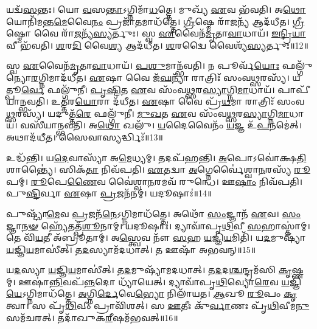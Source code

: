 𑌯𑌦𑍍𑌵᳴\-\ul{𑌸}\-𑌨𑍍𑌤𑌃।
𑌯𑍋 \ul{𑌵}\-𑌸\-\ul{𑌨𑍍𑌤𑌾}\-\-𑌽𑌗𑍍𑌨𑌿𑌮𑌾᳴\-\ul{𑌧}\-𑌤𑍍𑌤𑍇।
𑌮𑍁𑌖𑍍𑌯᳴ \ul{𑌏}\-𑌵 𑌭᳴𑌵𑌤𑌿।
𑌅\-\ul{𑌥𑍋} 𑌯𑍋𑌨𑌿᳴𑌮𑌨𑍍𑌤\-\ul{𑌮𑍇}\-𑌵𑍈\-\ul{𑌨𑌂} 𑌪𑍍𑌰𑌜𑌾᳴\-\ul{𑌤}\-𑌮𑌾𑌧᳴𑌤𑍍𑌤𑍇।
\-\ul{𑌗𑍍𑌰𑍀}\-𑌷𑍍𑌮𑍇 𑌰𑌾᳴\-\ul{𑌜}\-𑌨𑍍𑌯᳴ 𑌆𑌦᳴𑌧𑍀𑌤।
\-\ul{𑌗𑍍𑌰𑍀}\-𑌷𑍍𑌮𑍋 𑌵𑍈 𑌰𑌾᳴\-\ul{𑌜}\-𑌨𑍍𑌯᳴\-\ul{𑌸𑍍𑌯}\-𑌰𑍍𑌤𑍁𑌃।
𑌸𑍍𑌵 \ul{𑌏}\-𑌵𑍈𑌨᳴\-\ul{𑌮𑍃}\-𑌤𑌾\-\ul{𑌵𑌾}\-𑌧𑌾𑌯᳴।
\-\ul{𑌇}\-\-\ul{𑌨𑍍𑌦𑍍𑌰𑌿}\-\-\ul{𑌯𑌾}\-𑌵𑍀 𑌭᳴𑌵𑌤𑌿।
\-\ul{𑌶}\-𑌰\-\ul{𑌦𑌿} 𑌵𑍈\-\ul{𑌶𑍍𑌯} 𑌆𑌦᳴𑌧𑍀𑌤।
\-\ul{𑌶}\-𑌰𑌦𑍍𑌵𑍈 𑌵𑍈𑌶𑍍𑌯᳴\-\ul{𑌸𑍍𑌯}\-𑌰𑍍𑌤𑍁𑌃॥12॥

𑌸𑍍𑌵 \ul{𑌏}\-𑌵𑍈𑌨᳴\-\ul{𑌮𑍃}\-𑌤𑌾\-\ul{𑌵𑌾}\-𑌧𑌾𑌯᳴।
\-\ul{𑌪}\-\-\ul{𑌶𑍁}\-𑌮𑌾𑌨𑍍𑌭᳴𑌵𑌤𑌿।
𑌨 𑌪𑍂𑌰𑍍𑌵᳴\-\ul{𑌯𑍋𑌃} 𑌫𑌲𑍍𑌗𑍁᳴𑌨𑍍𑌯𑍋\-\ul{𑌰}\-𑌗𑍍𑌨𑌿𑌮𑌾𑌦᳴𑌧𑍀𑌤।
\-\ul{𑌏}\-𑌷𑌾 𑌵𑍈 𑌜᳴\-\ul{𑌘}\-𑌨𑍍𑌯𑌾᳴ 𑌰𑌾𑌤𑍍𑌰𑌿𑌃᳴ 𑌸𑌂𑌵\-\ul{𑌥𑍍𑌸}\-𑌰𑌸𑍍𑌯᳴।
𑌯𑌤𑍍𑌪𑍂\-\ul{𑌰𑍍𑌵𑍇} 𑌫𑌲𑍍𑌗𑍁᳴𑌨𑍀।
\-\ul{𑌪𑍃}\-\-\ul{𑌷𑍍𑌟𑌿}\-𑌤 \ul{𑌏}\-𑌵 𑌸𑌂᳴𑌵\-\ul{𑌥𑍍𑌸}\-𑌰\-\ul{𑌸𑍍𑌯𑌾}\-𑌗𑍍𑌨𑌿\-\ul{𑌮𑌾}\-𑌧𑌾𑌯᳴।
𑌪𑌾𑌪𑍀᳴𑌯𑌾𑌨𑍍𑌭𑌵𑌤𑌿।
𑌉𑌤𑍍𑌤᳴𑌰\-\ul{𑌯𑍋}\-𑌰𑌾 𑌦᳴𑌧𑍀𑌤।
\-\ul{𑌏}\-𑌷𑌾 𑌵𑍈 𑌪𑍍𑌰᳴\-\ul{𑌥}\-𑌮𑌾 𑌰𑌾𑌤𑍍𑌰𑌿𑌃᳴ 𑌸𑌂𑌵\-\ul{𑌥𑍍𑌸}\-𑌰𑌸𑍍𑌯᳴।
𑌯𑌦𑍁𑌤𑍍𑌤᳴\-\ul{𑌰𑍇} 𑌫𑌲𑍍𑌗𑍁᳴𑌨𑍀।
\-\ul{𑌮𑍁}\-\-\ul{𑌖}\-𑌤 \ul{𑌏}\-𑌵 𑌸𑌂᳴𑌵\-\ul{𑌥𑍍𑌸}\-𑌰\-\ul{𑌸𑍍𑌯𑌾}\-𑌗𑍍𑌨𑌿\-\ul{𑌮𑌾}\-𑌧𑌾𑌯᳴।
𑌵𑌸𑍀᳴𑌯𑌾𑌨𑍍𑌭𑌵𑌤𑌿।
𑌅\-\ul{𑌥𑍋} 𑌖𑌲𑍁᳴।
\-\ul{𑌯}\-𑌦𑍈𑌵𑍈𑌨𑌂᳴ \ul{𑌯}\-𑌜𑍍𑌞 𑌉᳴\-\ul{𑌪}\-𑌨𑌮𑍇॑𑌤𑍍।
𑌅𑌥𑌾𑌦᳴𑌧𑍀𑌤।
𑌸𑍈𑌵𑌾𑌸𑍍𑌯𑌰𑍍𑌦𑍍𑌧𑌿𑌃᳴॥13॥\anuvakamend[𑌖𑌲𑍍𑌵𑌾᳴𑌧𑌿𑌥𑍍𑌸\-\ul{𑌨𑍍𑌤} 𑌫𑌲𑍍𑌗𑍁᳴𑌨𑍍𑌯𑍋\-\ul{𑌰}\-𑌗𑍍𑌨𑌿𑌮𑌾𑌦᳴𑌧𑍀𑌤𑌾𑌸𑌨𑍍𑌨𑌪𑌤𑌤𑌾𑌮𑍃\-\ul{𑌤𑍂}\-𑌨𑌾𑌂 𑌵𑍈𑌶𑍍𑌯᳴\-\ul{𑌸𑍍𑌯}\-𑌰𑍍𑌤𑍁𑌰𑍁𑌤𑍍𑌤᳴\-\ul{𑌰𑍇} 𑌫𑌲𑍍𑌗𑍁᳴\-\ul{𑌨𑍀} 𑌷𑌟𑍍𑌚᳴]

𑌉𑌦𑍍𑌧᳴𑌨𑍍𑌤𑌿।
𑌯\-\ul{𑌦𑍇}\-𑌵𑌾𑌸𑍍𑌯𑌾᳴ 𑌅\-\ul{𑌮𑍇}\-𑌧𑍍𑌯𑌮𑍍।
𑌤𑌦𑌪᳴𑌹𑌨𑍍𑌤𑌿।
\-\ul{𑌅}\-𑌪𑍋𑌽𑌵𑍋॑𑌕𑍍𑌷\-\ul{𑌤𑌿} 𑌶𑌾𑌨𑍍𑌤𑍍𑌯𑍈॑।
𑌸𑌿𑌕᳴\-\ul{𑌤𑌾} 𑌨𑌿𑌵᳴𑌪𑌤𑌿।
\-\ul{𑌏}\-𑌤𑌦𑍍𑌵𑌾 \ul{𑌅}\-𑌗𑍍𑌨𑍇𑌰𑍍𑌵𑍈॑𑌶𑍍𑌵𑌾\-\ul{𑌨}\-𑌰𑌸𑍍𑌯᳴ \ul{𑌰𑍂}\-𑌪𑌮𑍍।
\-\ul{𑌰𑍂}\-𑌪𑍇\-\ul{𑌣𑍈}\-𑌵 𑌵𑍈॑𑌶𑍍𑌵𑌾\-\ul{𑌨}\-𑌰𑌮𑌵᳴ 𑌰𑍁𑌨𑍍𑌧𑍇।
𑌊\-\ul{𑌷𑌾𑌂} 𑌨𑌿𑌵᳴𑌪𑌤𑌿।
𑌪𑍁\-\ul{𑌷𑍍𑌟𑌿}\-𑌰𑍍𑌵𑌾 \ul{𑌏}\-𑌷𑌾 \ul{𑌪𑍍𑌰}\-𑌜𑌨᳴𑌨𑌮𑍍।
𑌯𑌦𑍂𑌷𑌾𑌃॑॥14॥

𑌪𑍁𑌷𑍍𑌟𑍍𑌯𑌾᳴\-\ul{𑌮𑍇}\-𑌵 \ul{𑌪𑍍𑌰}\-𑌜𑌨᳴\-\ul{𑌨𑍇}\-\-𑌽𑌗𑍍𑌨𑌿𑌮𑌾𑌧᳴𑌤𑍍𑌤𑍇।
𑌅𑌥𑍋᳴ \ul{𑌸𑌂}\-𑌜𑍍𑌞𑌾𑌨᳴ \ul{𑌏}\-𑌵।
\-\ul{𑌸𑌂}\-𑌜𑍍𑌞𑌾\-\ul{𑌨}\-\-\ul{𑍟} 𑌹𑍍𑌯𑍇᳴𑌤𑌤𑍍𑌪᳴\-\ul{𑌶𑍂}\-𑌨𑌾𑌮𑍍।
𑌯𑌦𑍂𑌷𑌾𑌃॑।
𑌦𑍍𑌯𑌾𑌵𑌾᳴𑌪𑍃\-\ul{𑌥𑌿}\-𑌵𑍀 \ul{𑌸}\-𑌹𑌾𑌸𑍍𑌤𑌾॑𑌮𑍍।
𑌤𑍇 𑌵𑌿᳴\-\ul{𑌯}\-𑌤𑍀 𑌅᳴𑌬𑍍𑌰𑍂𑌤𑌾𑌮𑍍।
𑌅\-\ul{𑌸𑍍𑌤𑍍𑌵𑍇}\-𑌵 𑌨𑍗᳴ \ul{𑌸}\-𑌹 \ul{𑌯}\-𑌜𑍍𑌞𑌿\-\ul{𑌯}\-𑌮𑌿𑌤𑌿᳴।
𑌯\-\ul{𑌦}\-𑌮𑍁𑌷𑍍𑌯𑌾᳴ \ul{𑌯}\-𑌜𑍍𑌞𑌿\-\ul{𑌯}\-𑌮𑌾𑌸𑍀॑𑌤𑍍।
𑌤\-\ul{𑌦}\-𑌸𑍍𑌯𑌾𑌮᳴𑌦𑌧𑌾𑌤𑍍।
𑌤 𑌊𑌷𑌾᳴ 𑌅𑌭𑌵𑌨𑍍॥15॥

𑌯\-\ul{𑌦}\-𑌸𑍍𑌯𑌾 \ul{𑌯}\-𑌜𑍍𑌞𑌿\-\ul{𑌯}\-𑌮𑌾𑌸𑍀॑𑌤𑍍।
𑌤\-\ul{𑌦}\-𑌮𑍁𑌷𑍍𑌯𑌾᳴𑌮𑌦𑌧𑌾𑌤𑍍।
𑌤\-\ul{𑌦}\-𑌦\-\ul{𑌶𑍍𑌚}\-𑌨𑍍𑌦𑍍𑌰𑌮᳴𑌸𑌿 \ul{𑌕𑍃}\-𑌷𑍍𑌣𑌮𑍍।
𑌊𑌷𑌾॑\-\ul{𑌨𑍍𑌨𑌿}\-𑌵𑌪᳴\-\ul{𑌨𑍍𑌨}\-𑌦𑍋 𑌧𑍍𑌯𑌾᳴𑌯𑍇𑌤𑍍।
𑌦𑍍𑌯𑌾𑌵𑌾᳴𑌪𑍃\-\ul{𑌥𑌿}\-𑌵𑍍𑌯𑍋\-\ul{𑌰𑍇}\-𑌵 \ul{𑌯}\-𑌜𑍍𑌞𑌿\-\ul{𑌯𑍇}\-\-𑌽𑌗𑍍𑌨𑌿𑌮𑌾𑌧᳴𑌤𑍍𑌤𑍇।
\-\ul{𑌅}\-𑌗𑍍𑌨𑌿\-\ul{𑌰𑍍𑌦𑍇}\-𑌵𑍇\-\ul{𑌭𑍍𑌯𑍋} 𑌨𑌿𑌲𑌾᳴𑌯𑌤।
\-\ul{𑌆}\-𑌖𑍂 \ul{𑌰𑍂}\-𑌪𑌂 \ul{𑌕𑍃}\-𑌤𑍍𑌵𑌾।
𑌸 𑌪𑍃᳴\-\ul{𑌥𑌿}\-𑌵𑍀𑌂 𑌪𑍍𑌰𑌾𑌵𑌿᳴𑌶𑌤𑍍।
𑌸 \ul{𑌊}\-𑌤𑍀𑌃 𑌕𑍁᳴\-\ul{𑌰𑍍𑌵𑌾}\-𑌣𑌃 𑌪𑍃᳴\-\ul{𑌥𑌿}\-𑌵𑍀𑌮\-\ul{𑌨𑍁} 𑌸𑌮᳴𑌚𑌰𑌤𑍍।
𑌤𑌦𑌾᳴𑌖𑍁𑌕\-\ul{𑌰𑍀}\-𑌷𑌮᳴𑌭𑌵𑌤𑍍॥16॥

